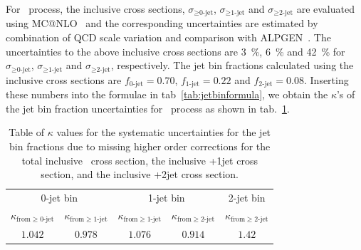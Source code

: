 For \qqww\ process, the inclusive cross sections, $\sigma_{\ge\textrm{0-jet}}$,
$\sigma_{\ge\textrm{1-jet}}$ and $\sigma_{\ge\textrm{2-jet}}$ are evaluated using MC@NLO~\cite{} 
and the corresponding uncertainties are estimated by combination of  
QCD scale variation and comparison with ALPGEN~\cite{}. 
The uncertainties to the above inclusive cross sections are 3~\%,  6~\% and 42~\% for  
$\sigma_{\ge\textrm{0-jet}}$, $\sigma_{\ge\textrm{1-jet}}$ and $\sigma_{\ge\textrm{2-jet}}$,
respectively.  
The jet bin fractions calculated using the inclusive cross sections are 
$f_{\textrm{0-jet}}=0.70$, $f_{\textrm{1-jet}}=0.22$ and $f_{\textrm{2-jet}}=0.08$.
Inserting these numbers into the formulae in tab~\ref{tab:jetbinformula}, 
we obtain the $\kappa$'s of the jet bin fraction uncertainties for \qqww\ process
as shown in tab.~\ref{tab:jetbinexcl_ww}. 
%
\begin{table}[!htbp]
\begin{center}
\begin{tabular}{cc|cc|c}
\hline
\multicolumn{2}{c|}{0-jet bin}  & \multicolumn{2}{c|}{1-jet bin}  & 2-jet bin \\
$\kappa_{\mathrm{from } \ge \textrm{0-jet}}$ & $\kappa_{\mathrm{from } \ge \textrm{1-jet}}$
& $\kappa_{\mathrm{from } \ge \textrm{1-jet}}$ & $\kappa_{\mathrm{from } \ge \textrm{2-jet}}$
& $\kappa_{\mathrm{from } \ge \textrm{2-jet}}$   \\
\hline \hline
$1.042$  & $ 0.978$  & $ 1.076$  & $ 0.914$  & $ 1.42$  \\
\hline
\end{tabular}
\caption{ Table of $\kappa$ values for the systematic uncertainties for the jet bin
fractions due to missing higher order corrections for the total inclusive \qqww\
cross section, the inclusive \qqww+1jet cross section, and the inclusive \qqww+2jet
cross section. }
\label{tab:jetbinexcl_ww}
\end{center}
\end{table}



